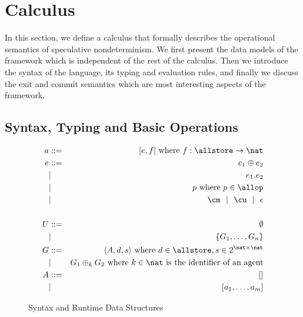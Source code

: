 \section{Calculus}\label{sec:calculus}

In this section, we define a calculus that formally describes the operational semantics
of speculative nondeterminism. We first present the data models of the framework which
is independent of the rest of the calculus. Then we introduce the syntax of the language,
its typing and evaluation rules, and finally we discuss the exit and commit semantics
which are most interesting aspects of the framework.



\subsection{Syntax, Typing and Basic Operations}\label{sec:rules}

\begin{figure}
  \centering
  \begin{eqnarray*}
    a & ::= & [e,f] \text{ where } f:\allstore\to\nat \\
    e & ::= & e_1 \oplus e_2 \\ 
      &   | & e_1 . e_2 \\
      &   | & p \text{ where } p\in\allop \\
      &   | & \cm  ~~|~~ \cu  ~~|~~ \epsilon \\
      &     & \\
    U & ::= & \emptyset \\
      &   | & \{G_1,\dots,G_n\} \\
    G & ::= & \langle A,d,s \rangle \text{ where } d\in\allstore, s\in2^{\nat\times\nat} \\
      &   | & G_1 \oplus_k G_2 \text{ where $k\in\nat$ is the identifier of an agent} \\
    A & ::= & [] \\
      &   | & [a_1,\dots,a_m]
  \end{eqnarray*}
  \caption{Syntax and Runtime Data Structures}
  \label{fig:syntax}
\end{figure}


